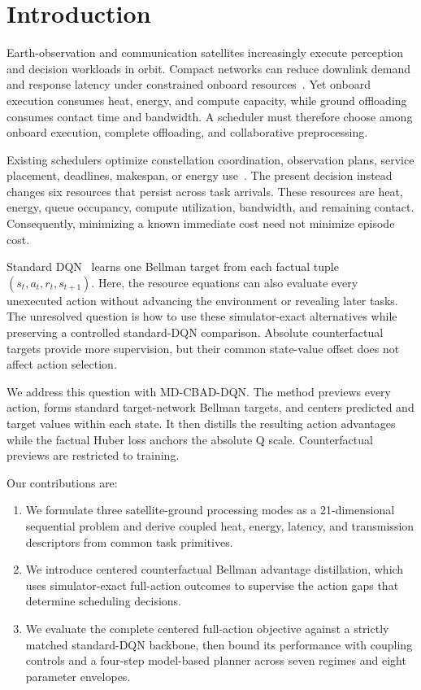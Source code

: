 \documentclass[11pt]{article}
\newcommand{\method}{MD-CBAD-DQN\xspace}
\begin{document}
\section{Introduction}

Earth-observation and communication satellites increasingly execute perception and decision workloads in orbit. Compact networks can reduce downlink demand and response latency under constrained onboard resources~\cite{9925218,10107454,10378728,10440355,10423050}. Yet onboard execution consumes heat, energy, and compute capacity, while ground offloading consumes contact time and bandwidth. A scheduler must therefore choose among onboard execution, complete offloading, and collaborative preprocessing.

Existing schedulers optimize constellation coordination, observation plans, service placement, deadlines, makespan, or energy use~\cite{RN8,RN9,RN10,RN20,RN22,RN23,RN27,RN28}. The present decision instead changes six resources that persist across task arrivals. These resources are heat, energy, queue occupancy, compute utilization, bandwidth, and remaining contact. Consequently, minimizing a known immediate cost need not minimize episode cost.

Standard DQN~\cite{mnih2015human,watkins1992q} learns one Bellman target from each factual tuple $(s_t,a_t,r_t,s_{t+1})$. Here, the resource equations can also evaluate every unexecuted action without advancing the environment or revealing later tasks. The unresolved question is how to use these simulator-exact alternatives while preserving a controlled standard-DQN comparison. Absolute counterfactual targets provide more supervision, but their common state-value offset does not affect action selection.

We address this question with \method. The method previews every action, forms standard target-network Bellman targets, and centers predicted and target values within each state. It then distills the resulting action advantages while the factual Huber loss anchors the absolute Q scale. Counterfactual previews are restricted to training.

Our contributions are:

\begin{enumerate}[leftmargin=1.6em]
    \item We formulate three satellite-ground processing modes as a 21-dimensional sequential problem and derive coupled heat, energy, latency, and transmission descriptors from common task primitives.
    \item We introduce centered counterfactual Bellman advantage distillation, which uses simulator-exact full-action outcomes to supervise the action gaps that determine scheduling decisions.
    \item We evaluate the complete centered full-action objective against a strictly matched standard-DQN backbone, then bound its performance with coupling controls and a four-step model-based planner across seven regimes and eight parameter envelopes.
\end{enumerate}
\end{document}
